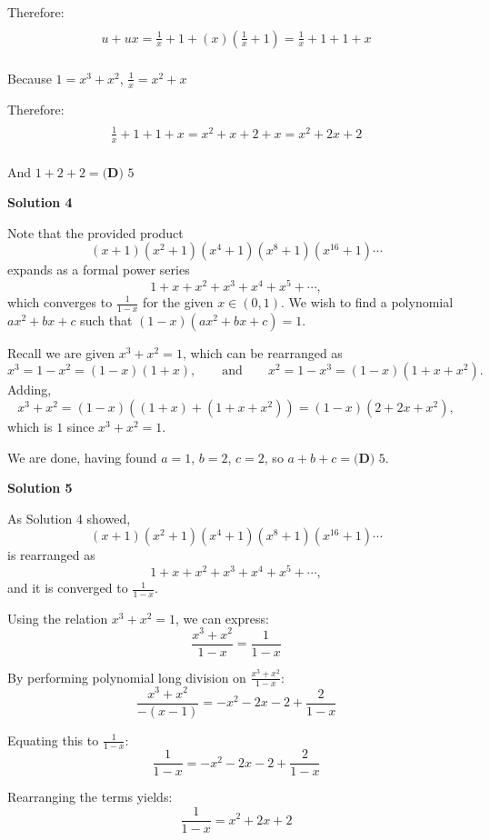 \begin{enumerate}
 Therefore:
 \begin{align*}\\ u + ux = \frac{1}{x} + 1 + (x)(\frac{1}{x} + 1) = \frac{1}{x} + 1 + 1 + x\\ \end{align*}


 Because $1 = x^3 + x^2$, $\frac{1}{x} = x^2 + x$

 Therefore:
 \begin{align*}\\ \frac{1}{x} + 1 + 1 + x = x^2 + x + 2 + x = x^2 + 2x + 2\\ \end{align*}


 And $1 + 2 + 2 = \boxed{\textbf{(D) }5}$




\textbf{Solution 4}

Note that the provided product
 \[(x + 1)(x^2 + 1)(x^4 + 1)(x^8 + 1)(x^{16} + 1)\dotsm\]expands as a formal power series
 \[1 + x + x^2 + x^3 + x^4 + x^5 + \dotsb,\]which converges to ${\frac{1}{1 - x}}$ for the given $x \in (0, 1)$. We wish to find a polynomial $ax^2 + bx + c$ such that $(1 - x)(ax^2 + bx + c) = 1$.

 Recall we are given $x^3 + x^2 = 1$, which can be rearranged as
 \[x^3 = 1 - x^2 = (1 - x)(1 + x), \qquad \text{and} \qquad x^2 = 1 - x^3 = (1 - x)(1 + x + x^2).\]Adding,
 \[x^3 + x^2 = (1 - x)((1 + x) + (1 + x + x^2)) = (1 - x)(2 + 2x + x^2),\]which is $1$ since $x^3 + x^2 = 1$.

 We are done, having found $a = 1$, $b = 2$, $c = 2$, so $a + b + c = \boxed{\textbf{(D) }5}$.

 



\textbf{Solution 5}

As Solution 4 showed, 
 \[(x + 1)(x^2 + 1)(x^4 + 1)(x^8 + 1)(x^{16} + 1)\dotsm\]is rearranged as 
 \[1 + x + x^2 + x^3 + x^4 + x^5 + \dotsb,\]and it is converged to $\frac{1}{1 - x}$.

 Using the relation $x^3 + x^2 = 1$, we can express:
 \[\frac{x^3 + x^2}{1-x} = \frac{1}{1-x}\]

 By performing polynomial long division on $\frac{x^3+x^2}{1-x}$:
 \[\frac{x^3+x^2}{-(x-1)} = -x^2 - 2x - 2 + \frac{2}{1-x}\]

 Equating this to $\frac{1}{1-x}$:
 \[\frac{1}{1-x} = -x^2 - 2x - 2 + \frac{2}{1-x}\]

 Rearranging the terms yields:
 \[\frac{1}{1-x} = x^2 + 2x + 2\]


\end{enumerate}
